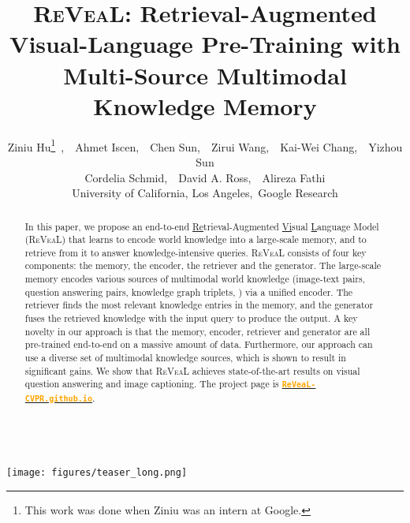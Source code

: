 \documentclass[10pt,twocolumn,letterpaper]{article}
\newcommand{\method}{R\textsc{e}V\textsc{ea}L\xspace}
\begin{document}
\author{Ziniu Hu\thanks{This work was done when Ziniu was an intern at Google.}\
   ,\ \ Ahmet Iscen,\ \ Chen Sun,\ \ Zirui Wang,\ \ Kai-Wei Chang,\ \ Yizhou Sun \\ 
   Cordelia Schmid,\ \ David A. Ross,\ \ Alireza Fathi  \\
      University of California, Los Angeles,\ Google Research
}






\title{\method: Retrieval-Augmented Visual-Language  Pre-Training with \\Multi-Source Multimodal Knowledge Memory}
\maketitle
\begin{strip}\centering
~\vspace{-4em}\\
    \texttt{[image: figures/teaser\_long.png]}
~\vspace{-1em}\\    
    \label{fig:fusion}
\end{strip}


\begin{abstract}



In this paper, we propose an end-to-end \underline{Re}trieval-Augmented \underline{Vi}sual \underline{L}anguage Model (\method) that learns to 
encode world knowledge into a large-scale memory, and to retrieve from it to answer knowledge-intensive queries.
\method consists of four key components: the memory, the encoder, the retriever and the generator. 
The large-scale memory encodes various sources of multimodal world knowledge (\eg image-text pairs, question answering pairs, knowledge graph triplets, \etc) via a unified encoder. 
The retriever finds the most relevant knowledge entries in the memory, and the generator fuses the retrieved knowledge with the input query to produce the output. A key novelty in our approach is that the memory, encoder, retriever and generator are all pre-trained end-to-end on a massive amount of data. Furthermore, our approach can use a diverse set of multimodal knowledge sources, which is shown to result in significant gains.  
We show that \method achieves state-of-the-art results on visual question answering and image captioning. The project page is {\tt \href{ReVeaL-CVPR.github.io}{\textbf{\textcolor{orange}{ReVeaL-CVPR.github.io}}}}.













 \end{abstract}
\end{document}
